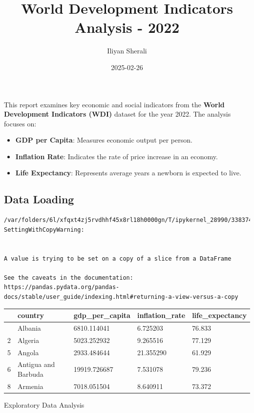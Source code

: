 \documentclass[
  letterpaper,
  DIV=11,
  numbers=noendperiod]{scrartcl}
\title{World Development Indicators Analysis - 2022}
\author{Iliyan Sherali}
\date{2025-02-26}
\providecommand{\tightlist}{%
  \setlength{\itemsep}{0pt}\setlength{\parskip}{0pt}}\usepackage{longtable,booktabs,array}
\begin{document}
\maketitle


This report examines key economic and social indicators from the
\textbf{World Development Indicators (WDI)} dataset for the year 2022.
The analysis focuses on:

\begin{itemize}
\tightlist
\item
  \textbf{GDP per Capita}: Measures economic output per person.
\item
  \textbf{Inflation Rate}: Indicates the rate of price increase in an
  economy.
\item
  \textbf{Life Expectancy}: Represents average years a newborn is
  expected to live.
\end{itemize}

\subsection{Data Loading}\label{data-loading}

\begin{verbatim}
/var/folders/6l/xfqxt4zj5rvdhhf45x8rl18h0000gn/T/ipykernel_28990/3383743568.py:10: SettingWithCopyWarning:


A value is trying to be set on a copy of a slice from a DataFrame

See the caveats in the documentation: https://pandas.pydata.org/pandas-docs/stable/user_guide/indexing.html#returning-a-view-versus-a-copy
\end{verbatim}

\begin{longtable}[]{@{}lllll@{}}
\toprule\noalign{}
& country & gdp\_per\_capita & inflation\_rate & life\_expectancy \\
\midrule\noalign{}
\endhead
\bottomrule\noalign{}
\endlastfoot
1 & Albania & 6810.114041 & 6.725203 & 76.833 \\
2 & Algeria & 5023.252932 & 9.265516 & 77.129 \\
5 & Angola & 2933.484644 & 21.355290 & 61.929 \\
6 & Antigua and Barbuda & 19919.726687 & 7.531078 & 79.236 \\
8 & Armenia & 7018.051504 & 8.640911 & 73.372 \\
\end{longtable}

Exploratory Data Analysis
\end{document}
